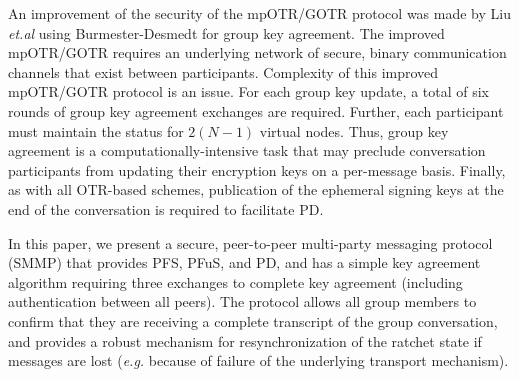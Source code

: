 \documentclass[%
preprint,
amsmath,amssymb,
aps,
prb,
floatfix,
]{revtex4-1}
\begin{document}
An improvement of the security of the mpOTR/GOTR protocol was made by Liu
\textit{et.al}\cite{ref:liu} using Burmester-Desmedt\cite{ref:burmester}
for group key agreement. The improved mpOTR/GOTR requires an
underlying network of secure, binary communication channels that exist between
participants.
Complexity of this improved mpOTR/GOTR protocol is an issue. For each group key
update, a total of six rounds of group key agreement exchanges are required.
Further, each participant must maintain the status for $2(N-1)$ virtual nodes.
Thus, group key agreement is a computationally-intensive task that
may preclude conversation participants from updating their encryption keys on a
per-message basis. Finally, as with all OTR-based schemes, publication of the
ephemeral signing keys at the end of the conversation is required to facilitate
PD.

In this paper, we present a secure, peer-to-peer multi-party messaging protocol
(SMMP) that provides PFS, PFuS, and PD, and has a simple key agreement
algorithm requiring three exchanges to complete key agreement (including
authentication between all peers).
The protocol allows all group members to confirm that they are
receiving a complete transcript of the group conversation, and provides a
robust mechanism for resynchronization of the ratchet state if messages are lost
(\textit{e.g.} because of failure of the underlying transport mechanism).
\end{document}
